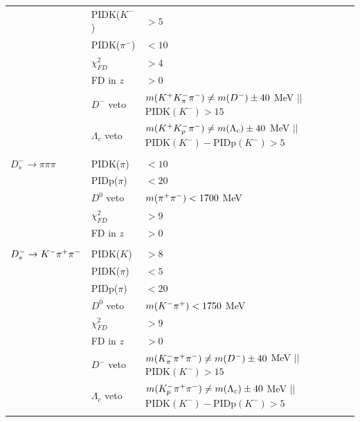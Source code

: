 \begin{table}[h]
{\begin{tabular}{l l l}
& PIDK($K^-$) & $> 5$ \\
& PIDK($\pi^-$) & $< 10$ \\
&  $\chi^{2}_{FD}$ & $> 4$ \\
&  FD in $z$  &$ > 0$ \\
& $D^-$ veto  & $m({{K}^+} K^-_\pi {\ensuremath{{\pi}^-}}) \ne m(D^-) \pm 40$ MeV  $||$ $\text{PIDK}(K^-) > 15$\\
& $\Lambda_c$ veto  & $m({{K}^+} K^-_p {{\pi}^-}) \ne m(\Lambda_c) \pm 40$ MeV  $||$ $\text{PIDK}(K^-)-\text{PIDp}(K^-) > 5$ \\
\\
$D_s^- \to \pi \pi \pi$ & PIDK($\pi$) & $< 10$  \\
& PIDp($\pi$) & $< 20$ \\
& $D^0$ veto  & $m({{\pi}^+} {{\pi}^-}) < 1700$ MeV\\
&  $\chi^{2}_{FD}$ & $> 9$ \\
&  FD in $z$  &$ > 0$ \\
\\
$D_s^- \rightarrow K^- {{\pi}^+} {{\pi}^-}$ & PIDK($K$) & $> 8$  \\
& PIDK($\pi$) & $< 5$ \\
& PIDp($\pi$) & $< 20$ \\
& $D^0$ veto  & $m(K^- {{\pi}^+}) < 1750$ MeV \\
&  $\chi^{2}_{FD}$ & $> 9$ \\
&  FD in $z$  &$ > 0$ \\
& $D^-$ veto  & $m(K^-_\pi {\ensuremath{{\pi}^+}} {\ensuremath{{\pi}^-}}) \ne m(D^-) \pm 40$ MeV  $||$ $\text{PIDK}(K^-) > 15$\\
& $\Lambda_c$ veto  & $m(K^-_p {{\pi}^+} {{\pi}^-}) \ne m(\Lambda_c) \pm 40$ MeV  $||$ $\text{PIDK}(K^-)-\text{PIDp}(K^-) > 5$ \\
\\
\hline
\hline
\end{tabular}
}
\label{table:selDs}
\end{table}


